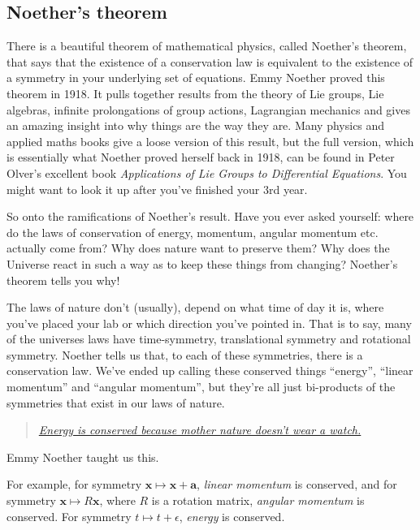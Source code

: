 \subsection{Noether's theorem}
There is a beautiful theorem of mathematical physics, called Noether’s theorem, that says that the existence of a conservation law is equivalent to the existence of a symmetry in your underlying set of equations. Emmy Noether proved this theorem in 1918. It pulls together results from the theory of Lie groups, Lie algebras, infinite prolongations of group actions, Lagrangian mechanics and gives an amazing insight into why things are the way they are. Many physics and applied maths books give a loose version of this result, but the full version, which is essentially what Noether proved herself back in 1918, can be found in Peter Olver’s excellent
book \textit{Applications of Lie Groups to Differential Equations}. You might want to look it up after you’ve finished your 3rd year. 

So onto the ramifications of Noether’s result. Have you ever asked yourself: where do
the laws of conservation of energy, momentum, angular momentum etc. actually come from? Why does nature want to preserve them? Why does the Universe react in such a way as to keep these things from changing? Noether’s theorem tells you why! 

The laws of nature don’t (usually), depend on what time of day it is, where you’ve placed your lab or which direction you’ve pointed in. That is to say, many of the universes laws have time-symmetry, translational symmetry and rotational symmetry. Noether tells
us that, to each of these symmetries, there is a conservation law. We’ve ended up calling these conserved things “energy”, “linear momentum” and “angular momentum”, but they’re all just bi-products of the symmetries that exist in our laws of nature. 
\begin{quote}
    \href{https://en.wikipedia.org/wiki/Noether\%27s_theorem}{\textit{Energy is conserved because mother nature doesn’t wear a watch.}}
\end{quote}
Emmy Noether taught us this.

For example, for symmetry $ \mathbf{x} \mapsto \mathbf{x}+\mathbf{a} $, \textit{linear momentum} is conserved, and for symmetry $ \mathbf{x} \mapsto R\mathbf{x} $, where $R$ is a rotation matrix, \textit{angular momentum }is conserved. For symmetry $ t \mapsto t+\epsilon $, \textit{energy} is conserved.

